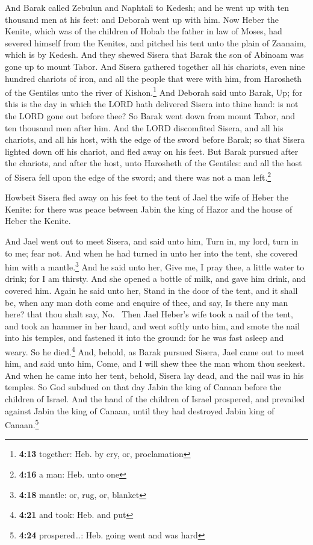  And Barak called Zebulun and Naphtali to Kedesh; and he
went up with ten thousand men at his feet: and Deborah went up with him.
 Now Heber the Kenite, which was of the children of Hobab
the father in law of Moses, had severed himself from the Kenites, and
pitched his tent unto the plain of Zaanaim, which is by Kedesh.
 And they shewed Sisera that Barak the son of Abinoam was
gone up to mount Tabor.  And Sisera gathered together all
his chariots, even nine hundred chariots of iron, and all the people
that were with him, from Harosheth of the Gentiles unto the river of
Kishon.\footnote{\textbf{4:13} together: Heb. by cry, or, proclamation}
 And Deborah said unto Barak, Up; for this is the day in
which the LORD hath delivered Sisera into thine hand: is not the LORD
gone out before thee? So Barak went down from mount Tabor, and ten
thousand men after him.  And the LORD discomfited Sisera,
and all his chariots, and all his host, with the edge of the sword
before Barak; so that Sisera lighted down off his chariot, and fled away
on his feet.  But Barak pursued after the chariots, and
after the host, unto Harosheth of the Gentiles: and all the host of
Sisera fell upon the edge of the sword; and there was not a man
left.\footnote{\textbf{4:16} a man: Heb. unto one}

 Howbeit Sisera fled away on his feet to the tent of Jael
the wife of Heber the Kenite: for there was peace between Jabin the king
of Hazor and the house of Heber the Kenite.

 And Jael went out to meet Sisera, and said unto him,
Turn in, my lord, turn in to me; fear not. And when he had turned in
unto her into the tent, she covered him with a mantle.\footnote{\textbf{4:18}
  mantle: or, rug, or, blanket}  And he said unto her,
Give me, I pray thee, a little water to drink; for I am thirsty. And she
opened a bottle of milk, and gave him drink, and covered him.
 Again he said unto her, Stand in the door of the tent,
and it shall be, when any man doth come and enquire of thee, and say, Is
there any man here? that thou shalt say, No.~ Then Jael
Heber's wife took a nail of the tent, and took an hammer in her hand,
and went softly unto him, and smote the nail into his temples, and
fastened it into the ground: for he was fast asleep and weary. So he
died.\footnote{\textbf{4:21} and took: Heb. and put} 
And, behold, as Barak pursued Sisera, Jael came out to meet him, and
said unto him, Come, and I will shew thee the man whom thou seekest. And
when he came into her tent, behold, Sisera lay dead, and the nail was in
his temples.  So God subdued on that day Jabin the king
of Canaan before the children of Israel.  And the hand of
the children of Israel prospered, and prevailed against Jabin the king
of Canaan, until they had destroyed Jabin king of Canaan.\footnote{\textbf{4:24}
  prospered\ldots: Heb. going went and was hard}

